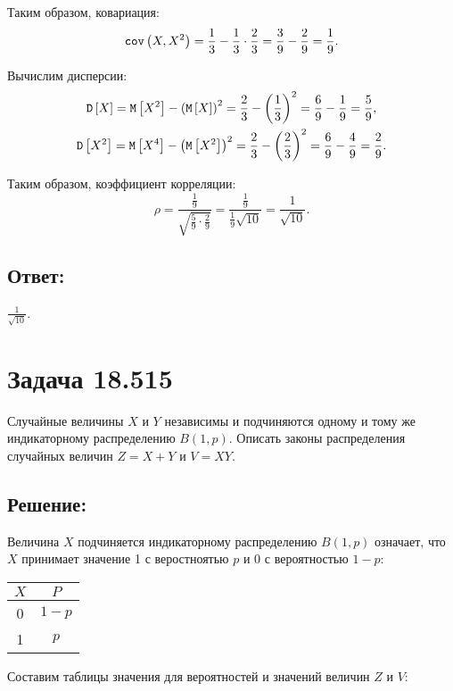 Таким образом, ковариация:
\begin{equation}
    \texttt{cov} \left ( X , X^2 \right ) = \frac{1}{3} - \frac{1}{3} \cdot \frac{2}{3} = \frac{3}{9} - \frac{2}{9} = \frac{1}{9} .
\end{equation}

Вычислим дисперсии:
\begin{gather}
    \mathtt{D} \left [ X \right ] = \mathtt{M} \left [ X^2 \right ] - \left ( \mathtt{M} \left [ X \right ] \right )^2 = \frac{2}{3} - \left ( \frac{1}{3} \right )^2 = \frac{6}{9} - \frac{1}{9} = \frac{5}{9} , \\
    \mathtt{D} \left [ X^2 \right ] = \mathtt{M} \left [ X^4 \right ] - \left ( \mathtt{M} \left [ X^2 \right ] \right )^2 = \frac{2}{3} - \left ( \frac{2}{3} \right )^2 = \frac{6}{9} - \frac{4}{9} = \frac{2}{9}.
\end{gather}

Таким образом, коэффициент корреляции:
\begin{equation}
    \rho = \frac{\frac{1}{9}}{\sqrt{\frac{5}{9} \cdot \frac{2}{9}}} = \frac{\frac{1}{9}}{\frac{1}{9} \sqrt{10}} = \frac{1}{\sqrt{10}} .
\end{equation}

\subsection*{Ответ:}
$\frac{1}{\sqrt{10}}$.

\section*{Задача 18.515}

Случайные величины $X$ и $Y$ независимы и подчиняются одному и тому же индикаторному распределению $B(1,p)$. Описать законы распределения случайных величин
$Z = X + Y$ и $V = X Y$.
\subsection*{Решение:}
Величина $X$ подчиняется индикаторному распределению $B(1,p)$ означает, что $X$ принимает значение 1 с веростноятью $p$ и 0 с вероятностью $1-p$:

\begin{tabular}{|c|c|}
    \hline
    $X$ & $P$   \\
    \hline
    0   & $1-p$ \\
    \hline
    1   & $p$   \\
    \hline
\end{tabular}

Составим таблицы значения для вероятностей и значений величин $Z$ и $V$:

